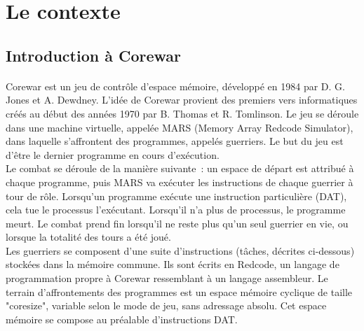 \documentclass[french]{article}
\begin{document}


\tableofcontents{}
\newpage

\section{Le contexte}
    \subsection{Introduction à Corewar}
        \paragraph{}Corewar est un jeu de contrôle d'espace mémoire, développé en 1984 par D. G. Jones et A. Dewdney. L’idée de Corewar provient des premiers vers informatiques créés au début des années 1970 par B. Thomas et R. Tomlinson. Le jeu se déroule dans une machine virtuelle, appelée MARS (Memory Array Redcode Simulator), dans laquelle s'affrontent des programmes, appelés guerriers. Le but du jeu est d’être le dernier programme en cours d’exécution.\\
    	Le combat se déroule de la manière suivante : un espace de départ est attribué à chaque programme, puis MARS va exécuter les instructions de chaque guerrier à tour de rôle. Lorsqu’un programme exécute une instruction particulière (DAT), cela tue le processus l’exécutant. Lorsqu’il n’a plus de processus, le programme meurt. Le combat prend fin lorsqu'il ne reste plus qu'un seul guerrier en vie, ou lorsque la totalité des tours a été joué. \\
    	Les guerriers se composent  d'une suite d’instructions (tâches, décrites ci-dessous) stockées dans la mémoire commune. Ils sont écrits en Redcode, un langage de programmation propre à Corewar ressemblant à un langage assembleur. Le terrain d’affrontements des programmes est un espace mémoire cyclique de taille "coresize", variable selon le mode de jeu, sans adressage absolu. Cet espace mémoire se compose au préalable d’instructions DAT. \\
        
\end{document}
